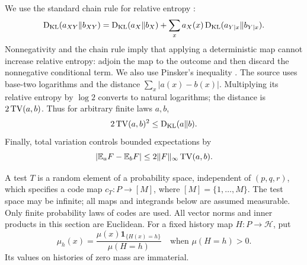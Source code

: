 We use the standard chain rule for relative entropy
\cite[Theorem~2.5.3]{CoverThomas2006}:
\begin{equation}\label{pred:chain-rule}
 \operatorname{D_{\mathrm{KL}}}(a_{XY}\Vert b_{XY})
 =\operatorname{D_{\mathrm{KL}}}(a_X\Vert b_X)
   +\sum_x a_X(x)\operatorname{D_{\mathrm{KL}}}(a_{Y\mid x}\Vert b_{Y\mid x}).
\end{equation}
Nonnegativity and the chain rule imply that applying a deterministic map
cannot increase relative entropy: adjoin the map to the outcome and then
discard the nonnegative conditional term. We also use Pinsker's inequality
\cite[Lemma~11.6.1]{CoverThomas2006}. The source uses base-two
logarithms and the distance \(\sum_x|a(x)-b(x)|\). Multiplying its
relative entropy by \(\log2\) converts to natural logarithms; the
distance is \(2\operatorname{TV}(a,b)\). Thus for arbitrary finite laws \(a,b\),
\begin{equation}\label{pred:pinsker}
 2\operatorname{TV}(a,b)^2\le\operatorname{D_{\mathrm{KL}}}(a\Vert b).
\end{equation}
Finally, total variation controls bounded expectations by
\begin{equation}\label{pred:tv-expectation}
 \lvert \mathbb E_a F-\mathbb E_b F\rvert\le2\lVert F\rVert_{\infty}\operatorname{TV}(a,b).
\end{equation}

A test \(T\) is a random element of a probability space, independent of
\((p,q,r)\), which specifies a code map \(c_T:P\to[M]\), where
\([M]=\{1,\ldots,M\}\).  The test space may be infinite; all maps and
integrands below are assumed measurable.  Only finite probability laws of
codes are used.  All vector norms and inner products in this section are
Euclidean.  For a fixed history map \(H:P\to\mathcal H\), put
\begin{equation}\label{pred:posterior-point}
 \mu_h(x)=\frac{\mu(x)\mathbf1_{\{H(x)=h\}}}{\mu(H=h)}
 \quad\text{when }\mu(H=h)>0.
\end{equation}
Its values on histories of zero mass are immaterial.

